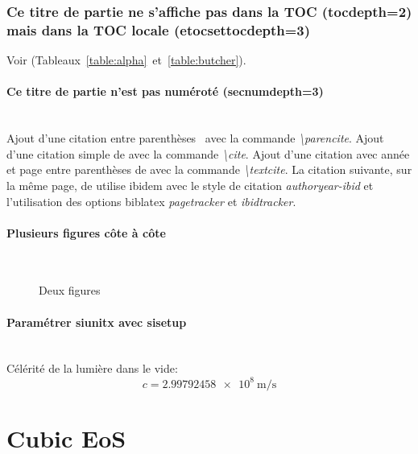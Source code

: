 		\subsubsection{Ce titre de partie ne s'affiche pas dans la TOC (tocdepth=2) mais dans la TOC locale (etocsettocdepth=3)}

			Voir (Tableaux~\ref{table:alpha}~et~\ref{table:butcher}).

			\paragraph{Ce titre de partie n'est pas numéroté (secnumdepth=3)}~~\\ %

				Ajout d'une citation entre parenthèses~\parencite{godard_borreliose_2012} avec la commande \textit{\textbackslash parencite}. Ajout d'une citation simple de \cite{zohdy_mapping_2012} avec la commande \textit{\textbackslash cite}. Ajout d'une citation avec année et page entre parenthèses de \textcite[9]{godard_borreliose_2012} avec la commande \textit{\textbackslash textcite}. La citation suivante, sur la même page, de \textcite[12]{godard_borreliose_2012} utilise ibidem avec le style de citation \textit{authoryear-ibid} et l'utilisation des options biblatex \textit{pagetracker} et \textit{ibidtracker}.

			\paragraph{Plusieurs figures côte à côte}~~\\

				\lipsum[66]


				\begin{figure}
					\centering
					\caption{Deux figures}
					\label{fig:deux_figures}
				\end{figure}

			\paragraph{Paramétrer siunitx avec sisetup}~~\\
			
        		Célérité de la lumière dans le vide: $$c=\SI{2.99792458e8}{\meter\per\second}$$
\section{Cubic EoS}
